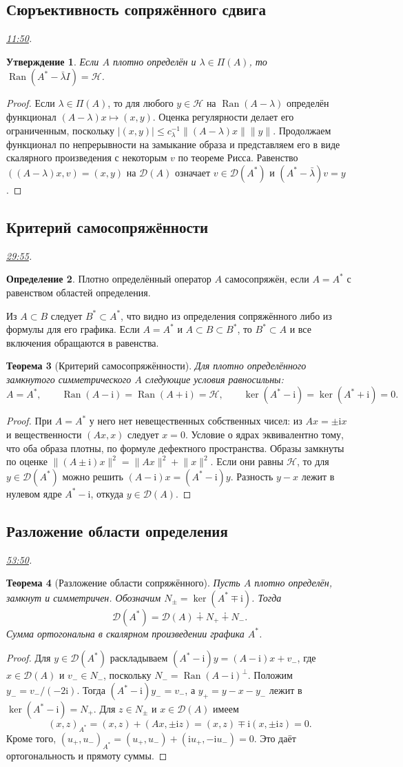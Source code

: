 \documentclass[11pt,a4paper]{article}
\theoremstyle{plain}
\newtheorem{theorem}{Теорема}[section]
\newtheorem{proposition}[theorem]{Утверждение}
\theoremstyle{definition}
\newtheorem{definition}[theorem]{Определение}
\newcommand{\Hh}{\mathcal H}
\newcommand{\Dom}{\mathcal D}
\newcommand{\id}{I}
\newcommand{\ii}{\mathrm i}
\newcommand{\abs}[1]{\lvert#1\rvert}
\newcommand{\norm}[1]{\lVert#1\rVert}
\DeclareMathOperator{\Ran}{Ran}
\newcommand{\at}[3]{\href{https://www.youtube.com/watch?v=#1&t=#2s}{#3}}
\newcommand{\topic}[2]{\Needspace{5\baselineskip}\subsection*{#1}\noindent\emph{#2.}\par\nobreak\smallskip}
\begin{document}
\topic{Сюръективность сопряжённого сдвига}{\at{DdQgQF1YTs8}{710}{11:50}}
\begin{proposition}
Если $A$ плотно определён и $\lambda\in\Pi(A)$, то
$\Ran(A^*-\bar\lambda\id)=\Hh$.
\end{proposition}
\begin{proof}
Если $\lambda\in\Pi(A)$, то для любого $y\in\Hh$ на
$\Ran(A-\lambda)$ определён функционал
$(A-\lambda)x\mapsto(x,y)$. Оценка регулярности делает его
ограниченным, поскольку
$\abs{(x,y)}\le c_\lambda^{-1}\norm{(A-\lambda)x}\norm y$.
Продолжаем функционал по непрерывности на замыкание
образа и представляем его в виде скалярного произведения
с некоторым $v$ по теореме Рисса. Равенство
$((A-\lambda)x,v)=(x,y)$ на $\Dom(A)$ означает
$v\in\Dom(A^*)$ и $(A^*-\bar\lambda)v=y$.
\end{proof}

\topic{Критерий самосопряжённости}{\at{DdQgQF1YTs8}{1795}{29:55}}
\begin{definition}
Плотно определённый оператор $A$ самосопряжён, если
$A=A^*$ с равенством областей определения.
\end{definition}
Из $A\subset B$ следует $B^*\subset A^*$, что видно
из определения сопряжённого либо из формулы для его графика.
Если $A=A^*$ и $A\subset B\subset B^*$, то
$B^*\subset A$ и все включения обращаются в равенства.
\begin{theorem}[Критерий самосопряжённости]
Для плотно определённого замкнутого симметрического $A$
следующие условия равносильны:
\[
 A=A^*,\qquad
 \Ran(A-\ii)=\Ran(A+\ii)=\Hh,\qquad
 \ker(A^*-\ii)=\ker(A^*+\ii)=0.
\]
\end{theorem}
\begin{proof}
При $A=A^*$ у него нет невещественных собственных чисел:
из $Ax=\pm\ii x$ и вещественности $(Ax,x)$
следует $x=0$. Условие о ядрах эквивалентно тому,
что оба образа плотны, по формуле дефектного пространства.
Образы замкнуты по оценке $\norm{(A\pm\ii)x}^2=\norm{Ax}^2+\norm x^2$.
Если они равны $\Hh$, то для $y\in\Dom(A^*)$ можно решить
$(A-\ii)x=(A^*-\ii)y$. Разность $y-x$ лежит в нулевом ядре
$A^*-\ii$, откуда $y\in\Dom(A)$.
\end{proof}

\topic{Разложение области определения}{\at{DdQgQF1YTs8}{3230}{53:50}}
\begin{theorem}[Разложение области сопряжённого]
Пусть $A$ плотно определён, замкнут и симметричен.
Обозначим $N_\pm=\ker(A^*\mp\ii)$. Тогда
\[
 \Dom(A^*)=\Dom(A)\dotplus N_+\dotplus N_-.
\]
Сумма ортогональна в скалярном произведении графика $A^*$.
\end{theorem}
\begin{proof}
Для $y\in\Dom(A^*)$ раскладываем
$(A^*-\ii)y=(A-\ii)x+v_-$,
где $x\in\Dom(A)$ и $v_-\in N_-$, поскольку
$N_-=\Ran(A-\ii)^\perp$.
Положим $y_-=v_-/(-2\ii)$. Тогда
$(A^*-\ii)y_-=v_-$, а
$y_+=y-x-y_-$ лежит в $\ker(A^*-\ii)=N_+$.
Для $z\in N_\pm$ и $x\in\Dom(A)$ имеем
\[
 (x,z)_{A^*}=(x,z)+(Ax,\pm\ii z)
             =(x,z)\mp\ii(x,\pm\ii z)=0 .
\]
Кроме того, $(u_+,u_-)_{A^*}=(u_+,u_-)+(\ii u_+,-\ii u_-)=0$.
Это даёт ортогональность и прямоту суммы.
\end{proof}
\end{document}
